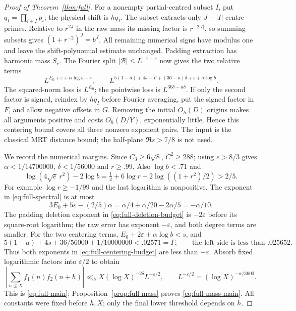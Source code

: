 \documentclass[11pt]{article}
\theoremstyle{definition}
\theoremstyle{remark}
\numberwithin{equation}{section}
\newcommand{\eps}{\varepsilon}
\begin{document}
\begin{proof}[Proof of Theorem~\ref{thm:full}]
For a nonempty partial-centred subset $I$, put $q_I=\prod_{i\in I}p_i$; the physical shift is $hq_I$.
The subset extracts only $J-|I|$ centre primes.
Relative to $r^{2J}$ in the raw mass its missing factor is $r^{-2|I|}$, so summing subsets gives
$(1+r^{-2})^J=b^J$. All remaining numerical signs have modulus one and leave the shift-polynomial estimate
unchanged. Padding extraction has harmonic mass $S_r$.
The Fourier split $|\mathcal B|\le L^{-1-s}$ now gives the two relative terms
\begin{equation}\label{eq:full-centering-budget}
 L^{E_0+\eps+\alpha\log b-s},\qquad
 L^{5(1-a)+4s-\Gamma+(36-a)\delta+\eps+\alpha\log b}.
\end{equation}
The squared-norm loss is $L^{E_0}$; the pointwise loss is $L^{36\delta-a\delta}$.
If only the second factor is signed, reindex by $hq_I$ before Fourier averaging, put the signed factor in $F$, and
allow negative offsets in $G$. Removing the initial $O_h(D)$ origins makes all arguments positive and costs
$O_h(D/Y)$, exponentially little. Hence this centering bound covers all three nonzero exponent pairs.
The input is the classical MRT distance bound; the half-plane $\Re s>7/8$ is not used.

We record the numerical margins. Since $C_3\ge6\sqrt8$, $C^2\ge288$; using $e>8/3$ gives
$\alpha<1/14700000$, $\delta<1/56000$ and $r\ge.99$.
Also $\log b<.71$ and
\begin{equation}\label{eq:full-spectral-margin}
 \log(4\sqrt e\,r^2)-2\log b
 =\tfrac12+6\log r-2\log((1+r^2)/2)>2/5.
\end{equation}
For example $\log r\ge-1/99$ and the last logarithm is nonpositive.
The exponent in \eqref{eq:full-spectral} is at most
\begin{equation}\label{eq:full-spectral-exponent}
 3E_0+5\eps-(2/5)\alpha=\alpha/4+\alpha/20-2\alpha/5=-\alpha/10.
\end{equation}
The padding deletion exponent in \eqref{eq:full-deletion-budget} is $-2\eps$ before its square-root logarithm;
the raw error has exponent $-\eps$, and both degree terms are smaller.
For the two centering terms, $E_0+2\eps+\alpha\log b<s$, and
\begin{equation}\label{eq:full-centering-margin}
 5(1-a)+4s+36/56000+1/10000000<.02571=\Gamma;
 \qquad\text{the left side is less than } .025652.
\end{equation}
Thus both exponents in \eqref{eq:full-centering-budget} are less than $-\eps$.
Absorb fixed logarithmic factors into $\eps/2$ to obtain
\begin{equation}\label{eq:full-final-saving}
 \left|\sum_{n\le X}f_1(n)f_2(n+h)\right|
 \ll_h X(\log X)^{-2\delta}L^{-\eps/2},\qquad
 L^{-\eps/2}=(\log X)^{-\alpha/3600}.
\end{equation}
This is \eqref{eq:full-main}; Proposition~\ref{prop:full-mass} proves \eqref{eq:full-mass-main}.
All constants were fixed before $h,X$; only the final lower threshold depends on $h$.
\end{proof}
\end{document}

